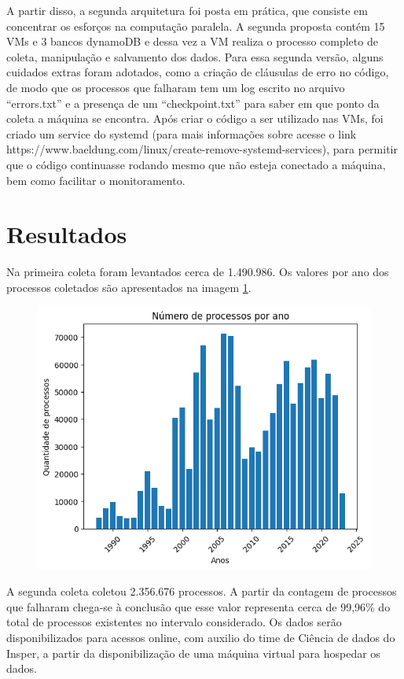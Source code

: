 A partir disso, a segunda arquitetura foi posta em prática, que consiste em concentrar os esforços na computação paralela. A segunda proposta contém 15 VMs e 3 bancos dynamoDB e dessa vez a VM realiza o processo completo de coleta, manipulação e salvamento dos dados. Para essa segunda versão, alguns cuidados extras foram adotados, como a criação de cláusulas de erro no código, de modo que os processos que falharam tem um log escrito no arquivo “errors.txt” e a presença de um “checkpoint.txt” para saber em que ponto da coleta a máquina se encontra. Após criar o código a ser utilizado nas VMs, foi criado um service do systemd (para mais informações sobre acesse o link https://www.baeldung.com/linux/create-remove-systemd-services), para permitir que o código continuasse rodando mesmo que não esteja conectado a máquina, bem como facilitar o monitoramento. 
	
\section{Resultados}

Na primeira coleta foram levantados cerca de 1.490.986. Os valores por ano dos processos coletados são apresentados na imagem \ref{fig_2}.

\begin{figure}
    \centering
    \caption{}
    \includegraphics[width = .5\linewidth]{relatorios/stf/imagens/img1.png}
    \label{fig_2}
\end{figure}

A segunda coleta coletou 2.356.676 processos. A partir da contagem de processos que falharam chega-se à conclusão que esse valor representa cerca de 99,96\% do total de processos existentes no intervalo considerado. Os dados serão disponibilizados para acessos online, com auxilio do time de Ciência de dados do Insper, a partir da disponibilização de uma máquina virtual para hospedar os dados.  



